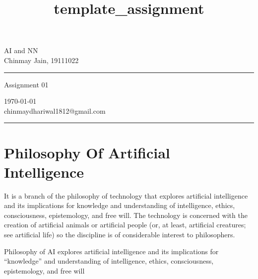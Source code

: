 \documentclass[a4paper,10pt]{article} %
\begin{document}

\title{template_assignment} %
\fancyhead[C]{}
\begin{minipage}{0.295\textwidth} %
\raggedright
AI and NN\\ %
\footnotesize %
Chinmay Jain, 19111022 %
\medskip\hrule
\end{minipage}
\begin{minipage}{0.4\textwidth} %
\centering 
\large %
Assignment 01\\ %

\end{minipage}
\begin{minipage}{0.295\textwidth} %
\raggedleft
\today\\ %
\footnotesize %
chinmaydhariwal1812@gmail.com%
\medskip\hrule
\end{minipage}






\section{Philosophy Of Artificial Intelligence}

It is a branch of the philosophy of technology that explores artificial intelligence and its implications for knowledge and understanding of intelligence, ethics, consciousness, epistemology, and free will.
 The technology is concerned with the creation of artificial animals or artificial people (or, at least, artificial creatures; see artificial life) so the discipline is of considerable interest to philosophers.
 
 
 Philosophy of AI 
 explores artificial intelligence and its implications for “knowledge” and  understanding of intelligence, ethics, consciousness, epistemology, and free  will 
\end{document}
